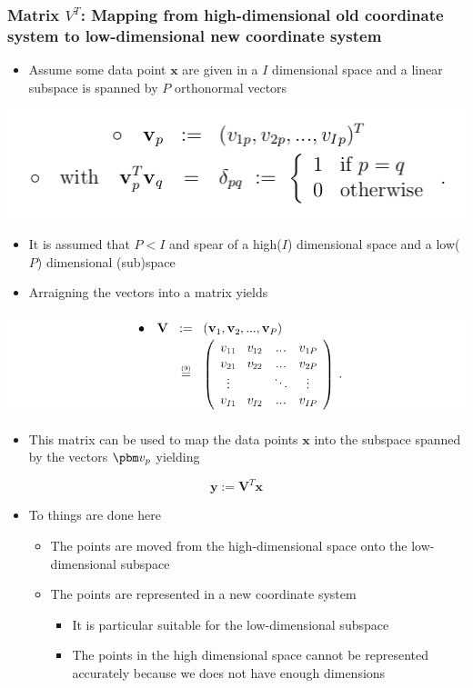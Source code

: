\documentclass[11pt]{article}
\begin{document}
\subsubsection{Matrix \(V^T\): Mapping from high-dimensional old coordinate system to low-dimensional new coordinate system}
\label{sec:org2569e48}
\begin{itemize}
\item Assume some data point \(\pmb x\) are given in a \(I\) dimensional space and a linear subspace is spanned by \(P\) orthonormal vectors
\end{itemize}
\begin{center}
\includegraphics[width=.9\linewidth]{Principal Component Analysis/screenshot_2018-11-20_21-09-02.png}
\end{center}
\begin{itemize}
\item It is assumed that \(P < I\) and spear of a high(\(I\)) dimensional space and a low(\(P\)) dimensional (sub)space
\item Arraigning the vectors into a matrix yields
\end{itemize}
\begin{center}
\includegraphics[width=.9\linewidth]{Principal Component Analysis/screenshot_2018-11-20_21-11-44.png}
\end{center} 
\begin{itemize}
\item This matrix can be used to map the data points \(\pmb x\) into the subspace spanned by the vectors \(\pbm v_p\) yielding
\end{itemize}
\begin{equation}
  \pmb y := \pmb V^T \pmb x
\end{equation}
\begin{itemize}
\item To things are done here
\begin{itemize}
\item The points are moved from the high-dimensional space onto the low-dimensional subspace
\item The points are represented in a new coordinate system
\begin{itemize}
\item It is particular suitable for the low-dimensional subspace
\item The points in the high dimensional space cannot be represented accurately because we does not have enough dimensions
\end{itemize}
\end{itemize}
\end{itemize}
\end{document}
